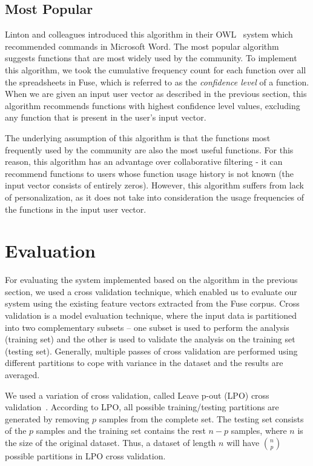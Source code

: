 \documentclass{article} %
\begin{document}
\subsection{Most Popular}
Linton and colleagues introduced this algorithm in their OWL~\cite{linton2000owl} system which recommended commands in Microsoft Word. The most popular algorithm suggests functions that are most widely used by the community. To implement this algorithm, we took the cumulative frequency count for each function over all the spreadsheets in Fuse, which is referred to as the \textit{confidence level} of a function. When we are given an input user vector as described in the previous section, this algorithm recommends functions with highest confidence level values, excluding any function that is present in the user's input vector.

The underlying assumption of this algorithm is that the functions most frequently used by the community are also the most useful functions. For this reason, this algorithm has an advantage over collaborative filtering - it can recommend functions to users whose function usage history is not known (the input vector consists of entirely zeros). However, this algorithm suffers from lack of personalization, as it does not take into consideration the usage frequencies of the functions in the input user vector.

\section{Evaluation}
For evaluating the system implemented based on the algorithm in the previous section, we used a cross validation technique, which enabled us to evaluate our system using the existing feature vectors extracted from the Fuse corpus. Cross validation is a model evaluation technique, where the input data is partitioned into two complementary subsets -- one subset is used to perform the analysis (training set) and the other is used to validate the analysis on the training set (testing set). Generally, multiple passes of cross validation are performed using different partitions  to cope with variance in the dataset and the results are averaged.

We used a variation of cross validation, called Leave p-out (LPO) cross validation~\cite{arlot2010survey}. According to LPO, all possible training/testing partitions are generated by removing $p$ samples from the complete set. The testing set consists of the $p$ samples and the training set contains the rest $n-p$ samples, where $n$ is the size of the original dataset. Thus, a dataset of length $n$ will have $n \choose p$ possible partitions in LPO cross validation.
\end{document}
